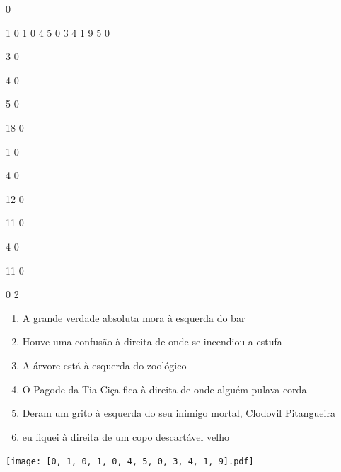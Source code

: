 \documentclass[12pt]{article}
\begin{document}
		\vfill  
		  
{
	0	%

	1	%
	0	%
	1	%
	0	%
	4	%
	5	%
	0	%
	3	%
	4	%
	1	%
	9	%
	5	%
	0	%

	3	%
	0	%

	4	%
	0	%

	5	%
	0	%

	18	%
	0	%

	1	%
	0	%

	4	%
	0	%

	12	%
	0	%

	11	%
	0	%

	4	%
	0	%

	11	%
	0	%

	0	%
	2	%
}	  
		    	

		 

\pagebreak


	\begin{enumerate}
		  \sffamily %
		  \large %


\vfill \item
A grande verdade absoluta mora	%
à esquerda
do bar	%

\vfill \item
Houve uma confusão	%
à direita
de onde se incendiou a estufa	%

\vfill \item
A árvore está	%
à esquerda
do zoológico	%

\vfill \item
O Pagode da Tia Ciça fica	%
à direita
de onde alguém pulava corda	%

\vfill \item
Deram um grito	%
à esquerda
do seu inimigo mortal, Clodovil Pitangueira	%

\vfill \item
eu fiquei	%
à direita
de um copo descartável velho	%
	\end{enumerate}
		  
		  \hfill

		  \vfill

\texttt{[image: [0, 1, 0, 1, 0, 4, 5, 0, 3, 4, 1, 9].pdf]}
\end{document}

